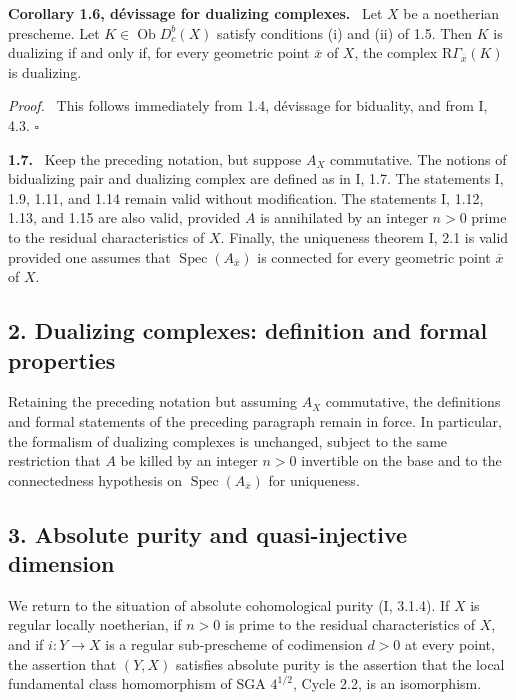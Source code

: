 \documentclass[11pt]{article}
\theoremstyle{plain}
\theoremstyle{definition}
\theoremstyle{remark}
\newenvironment{statement}[1]{\par\medskip\noindent\textbf{#1.}\ }{\par\medskip}
\newenvironment{prooftext}{\par\noindent\textit{Proof.}\ }{\par\medskip}
\DeclareMathOperator{\Spec}{Spec}
\DeclareMathOperator{\ob}{Ob}
\newcommand{\ol}[1]{\overline{#1}}
\newcommand{\R}{\mathrm R}
\newcommand{\qedtext}{\hfill$\square$}
\begin{document}
\begin{statement}{Corollary 1.6, dévissage for dualizing complexes}
Let $X$ be a noetherian prescheme. Let $K\in\ob D_c^b(X)$ satisfy conditions (i) and (ii) of 1.5. Then $K$ is dualizing if and only if, for every geometric point $\ol x$ of $X$, the complex $\R\Gamma_{\ol x}(K)$ is dualizing.
\end{statement}

\begin{prooftext}
This follows immediately from 1.4, dévissage for biduality, and from I, 4.3. \qedtext
\end{prooftext}

\begin{statement}{1.7}
Keep the preceding notation, but suppose $A_X$ commutative. The notions of bidualizing pair and dualizing complex are defined as in I, 1.7. The statements I, 1.9, 1.11, and 1.14 remain valid without modification. The statements I, 1.12, 1.13, and 1.15 are also valid, provided $A$ is annihilated by an integer $n>0$ prime to the residual characteristics of $X$. Finally, the uniqueness theorem I, 2.1 is valid provided one assumes that $\Spec(A_{\ol x})$ is connected for every geometric point $\ol x$ of $X$.
\end{statement}

\subsection*{2. Dualizing complexes: definition and formal properties}

Retaining the preceding notation but assuming $A_X$ commutative, the definitions and formal statements of the preceding paragraph remain in force. In particular, the formalism of dualizing complexes is unchanged, subject to the same restriction that $A$ be killed by an integer $n>0$ invertible on the base and to the connectedness hypothesis on $\Spec(A_{\ol x})$ for uniqueness.

\subsection*{3. Absolute purity and quasi-injective dimension}

We return to the situation of absolute cohomological purity (I, 3.1.4). If $X$ is regular locally noetherian, if $n>0$ is prime to the residual characteristics of $X$, and if $i:Y\to X$ is a regular sub-prescheme of codimension $d>0$ at every point, the assertion that $(Y,X)$ satisfies absolute purity is the assertion that the local fundamental class homomorphism of SGA $4^{1/2}$, Cycle 2.2, is an isomorphism.
\end{document}
